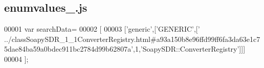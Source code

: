 \subsection{enumvalues\+\_.\+js}
\label{enumvalues__3_8js_source}

\begin{DoxyCode}
00001 var searchData=
00002 [
00003   [\textcolor{stringliteral}{'generic'},[\textcolor{stringliteral}{'GENERIC'},[\textcolor{stringliteral}{'
      ../classSoapySDR\_1\_1ConverterRegistry.html#a93a150b8e96ffd99ff6fa3da63e1c75dae84ba59a0bdec911bc2784d99b62807a'},1,\textcolor{stringliteral}{'SoapySDR::ConverterRegistry'}]]]
00004 ];
\end{DoxyCode}
